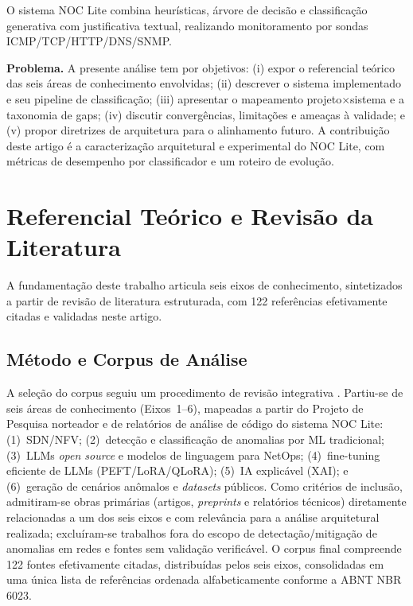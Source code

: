 \documentclass[12pt,a4paper]{article}
\begin{document}
O sistema NOC Lite combina heurísticas, árvore de decisão e classificação generativa com justificativa textual, realizando monitoramento por sondas ICMP/TCP/HTTP/DNS/SNMP.

\textbf{Problema.} A presente análise tem por objetivos: (i) expor o referencial teórico das seis áreas de
conhecimento envolvidas; (ii) descrever o sistema implementado e seu pipeline
de classificação; (iii) apresentar o mapeamento projeto$\times$sistema e a
taxonomia de gaps; (iv) discutir convergências, limitações e ameaças à
validade; e (v) propor diretrizes de arquitetura para o alinhamento futuro.
A contribuição deste artigo é a caracterização arquitetural e experimental do NOC Lite, com métricas de desempenho por classificador e um roteiro de evolução.

\section{Referencial Teórico e Revisão da Literatura}
\label{sec:referencial}

A fundamentação deste trabalho articula seis eixos de conhecimento, sintetizados
a partir de revisão de literatura estruturada, com 122 referências efetivamente
citadas e validadas neste artigo.

\subsection{Método e Corpus de Análise}
\label{sec:metodo}

A seleção do corpus seguiu um procedimento de revisão integrativa
\cite{rA28}\cite{rA212}. Partiu-se de seis áreas de conhecimento
(Eixos~1--6), mapeadas a partir do Projeto de Pesquisa norteador
 e de relatórios de análise de código do sistema NOC
Lite: (1)~SDN/NFV; (2)~detecção e classificação de anomalias por ML
tradicional; (3)~LLMs \textit{open source} e modelos de linguagem para
NetOps; (4)~fine-tuning eficiente de LLMs (PEFT/LoRA/QLoRA); (5)~IA
explicável (XAI); e (6)~geração de cenários anômalos e \textit{datasets}
públicos. Como critérios de inclusão, admitiram-se obras primárias
(artigos, \textit{preprints} e relatórios técnicos) diretamente
relacionadas a um dos seis eixos e com relevância para a análise
arquitetural realizada; excluíram-se trabalhos fora do escopo de
detectação/mitigação de anomalias em redes e fontes sem validação
verificável. O corpus final compreende 122 fontes efetivamente citadas,
distribuídas pelos seis eixos, consolidadas em uma única lista de
referências ordenada alfabeticamente conforme a ABNT NBR 6023.
\end{document}
